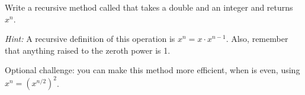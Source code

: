 \begin{exercise}  %
\label{ex.power}

Write a recursive method called  that takes a double  and an integer  and returns $x^n$.

{\em Hint:} A recursive definition of this operation is $x^n = x \cdot x^{n-1}$.
Also, remember that anything raised to the zeroth power is 1.

Optional challenge: you can make this method more efficient, when  is even, using $x^n = \left( x^{n/2} \right)^2$.

\end{exercise}


\begin{exercise}  %










\end{exercise}


